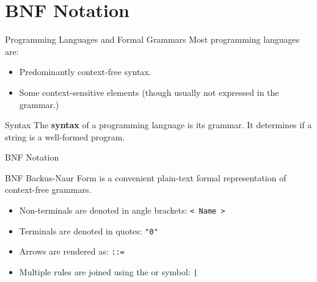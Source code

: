 \documentclass[]{beamer}
\newenvironment{code}{%
 \VerbatimEnvironment
 \begin{adjustbox}{max width=\textwidth, max height=0.7\textheight}
 \begin{BVerbatim}
  }{
  \end{BVerbatim}
 \end{adjustbox}
}
\begin{document}
\section{BNF Notation}

\begin{frame}{Programming Languages and Formal Grammars}
    Most programming languages are:
    \begin{itemize}
        \item Predominantly context-free syntax.
        \item Some context-sensitive elements (though usually not expressed in the grammar.)
    \end{itemize}
    
    \begin{block}{Syntax}
        The {\bf syntax} of a programming language is its grammar. It determines if a string
        is a well-formed program.
    \end{block}
\end{frame}

\begin{frame}{BNF Notation}
    \begin{block}{BNF}
        Backus-Naur Form is a convenient plain-text formal representation of context-free grammars.
    \end{block}
    \begin{itemize}
        \item Non-terminals are denoted in angle brackets: \texttt{< Name >}
        \item Terminals are denoted in quotes: \texttt{"0"}
        \item Arrows are rendered as: \texttt{::=}
        \item Multiple rules are joined using the or symbol: \texttt{|}
    \end{itemize}
\end{frame}

\end{document}
